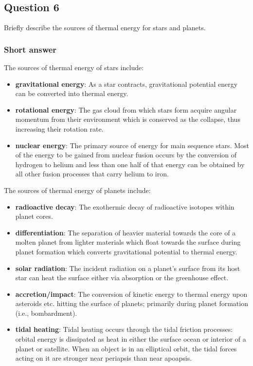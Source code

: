 \documentclass[a4paper,10pt]{article}
\begin{document}

\newpage
\subsection{Question 6}

Briefly describe the sources of thermal energy for stars and planets.

\subsubsection{Short answer}

The sources of thermal energy of stars include:

\begin{itemize}
    \item \textbf{gravitational energy}: As a star contracts, gravitational potential energy can be converted into thermal energy.
    \item \textbf{rotational energy}: The gas cloud from which stars form acquire angular momentum from their environment which is conserved as the collapse, thus increasing their rotation rate.
    \item \textbf{nuclear energy}: The primary source of energy for main sequence stars. Most of the energy to be gained from nuclear fusion occurs by the conversion of hydrogen to helium and less than one half of that energy can be obtained by all other fusion processes that carry helium to iron.
\end{itemize}

{\noindent}The sources of thermal energy of planets include:

\begin{itemize}
    \item \textbf{radioactive decay}: The exothermic decay of radioactive isotopes within planet cores.
    \item \textbf{differentiation}: The separation of heavier material towards the core of a molten planet from lighter materials which float towards the surface during planet formation which converts gravitational potential to thermal energy.
    \item \textbf{solar radiation}: The incident radiation on a planet's surface from its host star can heat the surface either via absorption or the greenhouse effect.
    \item \textbf{accretion/impact}: The conversion of kinetic energy to thermal energy upon asteroids etc. hitting the surface of planets; primarily during planet formation (i.e., bombardment).
    \item \textbf{tidal heating}: Tidal heating occurs through the tidal friction processes: orbital energy is dissipated as heat in either the surface ocean or interior of a planet or satellite. When an object is in an elliptical orbit, the tidal forces acting on it are stronger near periapsis than near apoapsis.
\end{itemize}
\end{document}
